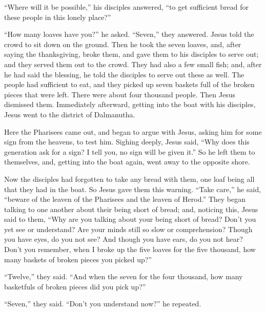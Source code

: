  ``Where will it be possible,'' his disciples answered, ``to
get sufficient bread for these people in this lonely place?''

 ``How many loaves have you?'' he asked. ``Seven,'' they
answered.  Jesus told the crowd to sit down on the ground.
Then he took the seven loaves, and, after saying the thanksgiving, broke
them, and gave them to his disciples to serve out; and they served them
out to the crowd.  They had also a few small fish; and,
after he had said the blessing, he told the disciples to serve out these
as well.  The people had sufficient to eat, and they picked
up seven baskets full of the broken pieces that were left. 
There were about four thousand people. Then Jesus dismissed them.
 Immediately afterward, getting into the boat with his
disciples, Jesus went to the district of Dalmanutha.

 Here the Pharisees came out, and began to argue with
Jesus, asking him for some sign from the heavens, to test him.
 Sighing deeply, Jesus said, ``Why does this generation ask
for a sign? I tell you, no sign will be given it.''  So he
left them to themselves, and, getting into the boat again, went away to
the opposite shore.

 Now the disciples had forgotten to take any bread with
them, one loaf being all that they had in the boat.  So
Jesus gave them this warning. ``Take care,'' he said, ``beware of the
leaven of the Pharisees and the leaven of Herod.''  They
began talking to one another about their being short of bread;
 and, noticing this, Jesus said to them, ``Why are you
talking about your being short of bread? Don't you yet see or
understand? Are your minds still so slow or comprehension? 
Though you have eyes, do you not see? And though you have ears, do you
not hear? Don't you remember,  when I broke up the five
loaves for the five thousand, how many baskets of broken pieces you
picked up?''

``Twelve,'' they said.  ``And when the seven for the four
thousand, how many basketfuls of broken pieces did you pick up?''

``Seven,'' they said.  ``Don't you understand now?'' he
repeated.

